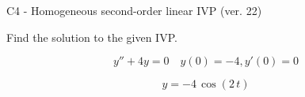 \begin{exercise}
  \begin{exerciseTitle}C4 - Homogeneous second-order linear IVP (ver. 22)\end{exerciseTitle}
  \begin{exerciseStatement}
    
Find the solution to the given IVP.

    
\[y''+4y = 0 \hspace{1em} y(0) = -4 , y'(0) = 0\]

  \end{exerciseStatement}
  \begin{exerciseAnswer}
    
\[y= -4 \, \cos\left(2 \, t\right)\]

  \end{exerciseAnswer}
\end{exercise}